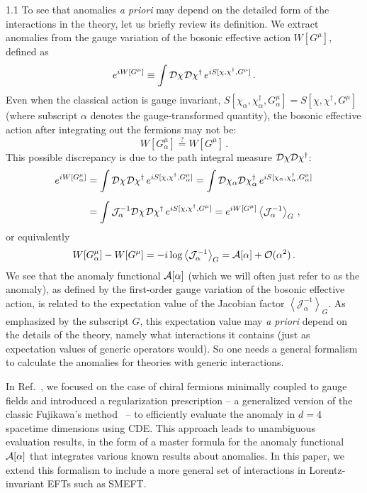 \documentclass[a4paper,12pt]{article}
\def\O{{\cal O}}
\def\Dcal{{\cal D}}
\def\Acal{{\cal A}}
\newcommand{\s}{\hspace{0.8pt}}
\begin{document}
\begin{spacing}{1.1}
To see that anomalies \emph{a priori} may depend on the detailed form of the interactions in the theory, let us briefly review its definition. We extract anomalies from the gauge variation of the bosonic effective action $W[G^\mu]$, defined as
\begin{equation}
e^{iW[G^\mu]} \equiv \int \Dcal\chi\s \Dcal\chi^\dagger \, e^{iS[\chi, \chi^\dagger, G^\mu]} \,.
\end{equation}
Even when the classical action is gauge invariant, $S[\chi_\alpha, \chi_\alpha^\dagger, G_\alpha^\mu] = S[\chi, \chi^\dagger, G^\mu]$ (where subscript $\alpha$ denotes the gauge-transformed quantity), the bosonic effective action after integrating out the fermions may not be:
\begin{equation}
W[G_\alpha^\mu] \stackrel{?}{=} W[G^\mu] \,.
\end{equation}
This possible discrepancy is due to the path integral measure $\Dcal\chi \Dcal\chi^\dagger$:
\begin{align}
e^{iW[G_\alpha^\mu]} &= \int \Dcal\chi\s \Dcal\chi^\dagger \, e^{iS[\chi, \chi^\dagger, G_\alpha^\mu]}
= \int \Dcal\chi_\alpha \Dcal\chi_\alpha^\dagger \, e^{iS[\chi_\alpha, \chi_\alpha^\dagger, G_\alpha^\mu]}
\notag\\[5pt]
&= \int \mathcal{J}_\alpha^{-1} \Dcal\chi\s \Dcal\chi^\dagger \, e^{iS[\chi, \chi^\dagger, G^\mu]}
= e^{iW[G^\mu]} \left\langle \mathcal{J}_\alpha^{-1} \right\rangle_G \,,
\end{align}
or equivalently
\begin{equation}
W[G_\alpha^\mu] - W[G^\mu] = -i\log \left\langle \mathcal{J}_\alpha^{-1}  \right\rangle_G = \Acal[\alpha]
+ \O(\alpha^2) \,.
\label{eqn:defineanomaly}
\end{equation}
We see that the anomaly functional $\Acal[\alpha]$ (which we will often just refer to as the anomaly), as defined by the first-order gauge variation of the bosonic effective action, is related to the expectation value of the Jacobian factor $\left\langle \mathcal{J}_\alpha^{-1} \right\rangle_G$. As emphasized by the subscript $G$, this expectation value may \emph{a priori} depend on the details of the theory, namely what interactions it contains (just as expectation values of generic operators would). So one needs a general formalism to calculate the anomalies for theories with generic interactions. 

In Ref.~\cite{Paper1}, we focused on the case of chiral fermions minimally coupled to gauge fields and introduced a regularization prescription -- a generalized version of the classic Fujikawa's method~\cite{Fujikawa:1979ay,Fujikawa:1980eg,Fujikawa:1983bg,Fujikawa:2004cx} -- to efficiently evaluate the anomaly in $d=4$ spacetime dimensions using CDE. This approach leads to unambiguous evaluation results, in the form of a master formula for the anomaly functional $\Acal[\alpha]$ that integrates various known results about anomalies. In this paper, we extend this formalism to include a more general set of interactions in Lorentz-invariant EFTs such as SMEFT.


\end{spacing}
\end{document}
